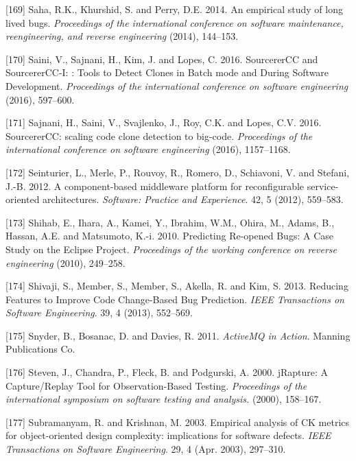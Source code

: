 \documentclass[12pt]{report}
\begin{document}
\hypertarget{ref-Saha2014}{}
{[}169{]} Saha, R.K., Khurshid, S. and Perry, D.E. 2014. An empirical
study of long lived bugs. \emph{Proceedings of the international
conference on software maintenance, reengineering, and reverse
engineering} (2014), 144--153.

\hypertarget{ref-Saini2016}{}
{[}170{]} Saini, V., Sajnani, H., Kim, J. and Lopes, C. 2016.
SourcererCC and SourcererCC-I: : Tools to Detect Clones in Batch mode
and During Software Development. \emph{Proceedings of the international
conference on software engineering} (2016), 597--600.

\hypertarget{ref-Sajnani2016}{}
{[}171{]} Sajnani, H., Saini, V., Svajlenko, J., Roy, C.K. and Lopes,
C.V. 2016. SourcererCC: scaling code clone detection to big-code.
\emph{Proceedings of the international conference on software
engineering} (2016), 1157--1168.

\hypertarget{ref-Seinturier2012}{}
{[}172{]} Seinturier, L., Merle, P., Rouvoy, R., Romero, D., Schiavoni,
V. and Stefani, J.-B. 2012. A component-based middleware platform for
reconfigurable service-oriented architectures. \emph{Software: Practice
and Experience}. 42, 5 (2012), 559--583.

\hypertarget{ref-Shihab2010}{}
{[}173{]} Shihab, E., Ihara, A., Kamei, Y., Ibrahim, W.M., Ohira, M.,
Adams, B., Hassan, A.E. and Matsumoto, K.-i. 2010. Predicting Re-opened
Bugs: A Case Study on the Eclipse Project. \emph{Proceedings of the
working conference on reverse engineering} (2010), 249--258.

\hypertarget{ref-Shivaji2013}{}
{[}174{]} Shivaji, S., Member, S., Member, S., Akella, R. and Kim, S.
2013. Reducing Features to Improve Code Change-Based Bug Prediction.
\emph{IEEE Transactions on Software Engineering}. 39, 4 (2013),
552--569.

\hypertarget{ref-snyder2011activemq}{}
{[}175{]} Snyder, B., Bosanac, D. and Davies, R. 2011. \emph{ActiveMQ in
Action}. Manning Publications Co.

\hypertarget{ref-Steven2000}{}
{[}176{]} Steven, J., Chandra, P., Fleck, B. and Podgurski, A. 2000.
jRapture: A Capture/Replay Tool for Observation-Based Testing.
\emph{Proceedings of the international symposium on software testing and
analysis.} (2000), 158--167.

\hypertarget{ref-Subramanyam2003}{}
{[}177{]} Subramanyam, R. and Krishnan, M. 2003. Empirical analysis of
CK metrics for object-oriented design complexity: implications for
software defects. \emph{IEEE Transactions on Software Engineering}. 29,
4 (Apr. 2003), 297--310.
\end{document}
